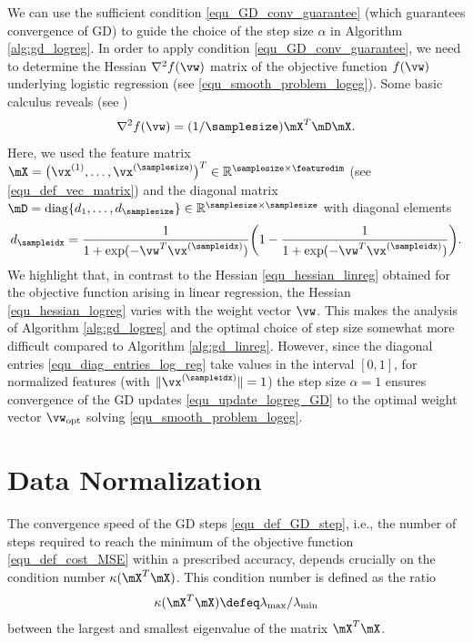 \documentclass[12pt]{report}
\begin{document}
We can use the sufficient condition \eqref{equ_GD_conv_guarantee} (which guarantees convergence of GD) 
to guide the choice of the step size $\alpha$ in Algorithm \ref{alg:gd_logreg}. In order to apply condition 
\eqref{equ_GD_conv_guarantee}, we need to determine the Hessian $\nabla^{2} f(\vw)$ matrix of the 
objective function $f(\vw)$ underlying logistic regression (see \eqref{equ_smooth_problem_logeg}). 
Some basic calculus reveals (see \cite[Ch. 4.4.]{hastie01statisticallearning})
\begin{equation}
\label{equ_hessian_logreg}
\nabla^{2} f(\vw) =  (1/\samplesize) \mX^{T} \mD \mX. 
\end{equation}
Here, we used the feature matrix $\mX=\big(\vx^{(1)},\ldots,\vx^{(\samplesize)}\big)^{T} \in \mathbb{R}^{\samplesize \times \featuredim}$ (see \eqref{equ_def_vec_matrix}) 
and the diagonal matrix $\mD = {\rm diag} \{d_{1},\ldots,d_{\samplesize}\} \in \mathbb{R}^{\samplesize \times \samplesize}$ with diagonal elements 
\begin{equation}
d_{\sampleidx} = \frac{1}{1+\exp(-\vw^{T} \vx^{(\sampleidx)})} \bigg(1- \frac{1}{1+\exp(-\vw^{T} \vx^{(\sampleidx)})}  \bigg). \label{equ_diag_entries_log_reg}   %
\end{equation} 
We highlight that, in contrast to the Hessian \eqref{equ_hessian_linreg} obtained for the objective function 
arising in linear regression, the Hessian \eqref{equ_hessian_logreg} varies with the weight vector $\vw$. 
This makes the analysis of Algorithm \ref{alg:gd_logreg} and the optimal choice of step size somewhat 
more difficult compared to Algorithm \ref{alg:gd_linreg}. However, since the diagonal entries \eqref{equ_diag_entries_log_reg} 
take values in the interval $[0,1]$, for normalized features (with $\| \vx^{(\sampleidx)} \|=1$) the step size $\alpha=1$ 
ensures convergence of the GD updates \eqref{equ_update_logreg_GD} to the optimal weight vector 
$\vw_{\rm opt}$ solving \eqref{equ_smooth_problem_logeg}. 

\section{Data Normalization} 

The convergence speed of the GD steps \eqref{equ_def_GD_step}, i.e., the 
number of steps required to reach the minimum of the objective function 
\eqref{equ_def_cost_MSE} within a prescribed accuracy, depends crucially 
on the condition number $\kappa( \mX^{T} \mX)$. This condition number is 
defined as the ratio 
\begin{equation}
\label{equ_def_condition_number} 
\kappa( \mX^{T} \mX) \defeq \lambda_{\rm max}/\lambda_{\rm min}
\end{equation} 
between the largest and smallest eigenvalue of the matrix $\mX^{T} \mX$. 
\end{document}
